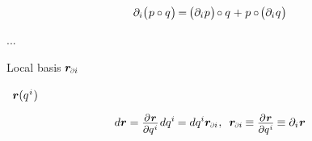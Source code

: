 \nopagebreak\vspace{-0.4em}\begin{equation}\label{productrulefordifferentiation}
\partial_i \bigl( \hspace{.15ex} p \circ q \hspace{.1ex} \bigr) \hspace{-0.2ex}
= \hspace{-0.2ex} \bigl( \partial_i \hspace{.1ex} p \hspace{.1ex} \bigr) \hspace{-0.25ex} \circ q \hspace{.12ex} +
\hspace{.1ex} p \circ \hspace{-0.25ex} \bigl( \partial_i \hspace{.1ex} q \hspace{.1ex} \bigr)
\end{equation}

...

Local basis ${\locationvector_\differentialindex{i}}$

 ~${\bm{r}(q^{\hspace{.1ex}i}\hspace{.1ex})}$ 

\nopagebreak\vspace{-0.2em}\begin{equation}\label{differentialoflocationvector}
d\locationvector
=
\scalebox{0.9}{$ \displaystyle\frac{\raisebox{-0.2em}{$ \partial \hspace{.15ex} \locationvector $}}{\partial q^{\hspace{.1ex}i}} $} \hspace{.2ex} dq^i \hspace{-0.1ex}
=
dq^i \locationvector_\differentialindex{i}
\hspace{.1ex} , \hspace{.5em}
\locationvector_\differentialindex{i} \hspace{-0.1ex} \equiv \scalebox{0.9}{$ \displaystyle\frac{\raisebox{-0.2em}{$ \partial \hspace{.15ex} \locationvector $}}{\partial q^{\hspace{.1ex}i}} $} \hspace{-0.1ex}
\equiv \partial_i \hspace{.1ex} \locationvector
\end{equation}

